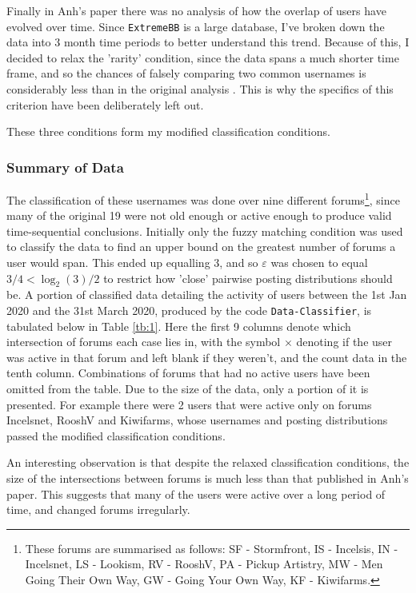 \documentclass[10pt,a4paper,notitlepage]{article}
\begin{document}
Finally in Anh's paper there was no analysis of how the overlap of users have evolved over time. Since \texttt{ExtremeBB} is a large database, I've broken down the data into 3 month time periods to better understand this trend. Because of this, I decided to relax the 'rarity' condition, since the data spans a much shorter time frame, and so the chances of falsely comparing two common usernames is considerably less than in the original analysis \cite{ExtremeBB}. This is why the specifics of this criterion have been deliberately left out. 

These three conditions form my modified classification conditions.
\subsubsection*{Summary of Data}
The classification of these usernames was done over nine different forums\footnote{These forums are summarised as follows: SF - Stormfront, IS - Incelsis, IN - Incelsnet, LS - Lookism, RV - RooshV, PA - Pickup Artistry, MW - Men Going Their Own Way, GW - Going Your Own Way, KF - Kiwifarms.}, since many of the original 19 were not old enough or active enough to produce valid time-sequential conclusions. Initially only the fuzzy matching condition was used to classify the data to find an upper bound on the greatest number of forums a user would span. This ended up equalling 3, and so $\varepsilon$ was chosen to equal $3/4<\log_{2}(3)/2$ to restrict how 'close' pairwise posting distributions should be. A portion of classified data detailing the activity of users between the 1st Jan 2020 and the 31st March 2020, produced by the code \texttt{Data-Classifier}, is tabulated below in Table \ref{tb:1}. Here the first 9 columns denote which intersection of forums each case lies in, with the symbol $\times$ denoting if the user was active in that forum and left blank if they weren't, and the count data in the tenth column.  Combinations of forums that had no active users have been omitted from the table. Due to the size of the data, only a portion of it is presented. For example there were 2 users that were active only on forums Incelsnet, RooshV and Kiwifarms, whose usernames and posting distributions passed the modified classification conditions. 

An interesting observation is that despite the relaxed classification conditions, the size of the intersections between forums is much less than that published in Anh's paper. This suggests that many of the users were active over a long period of time, and changed forums irregularly.
\end{document}
